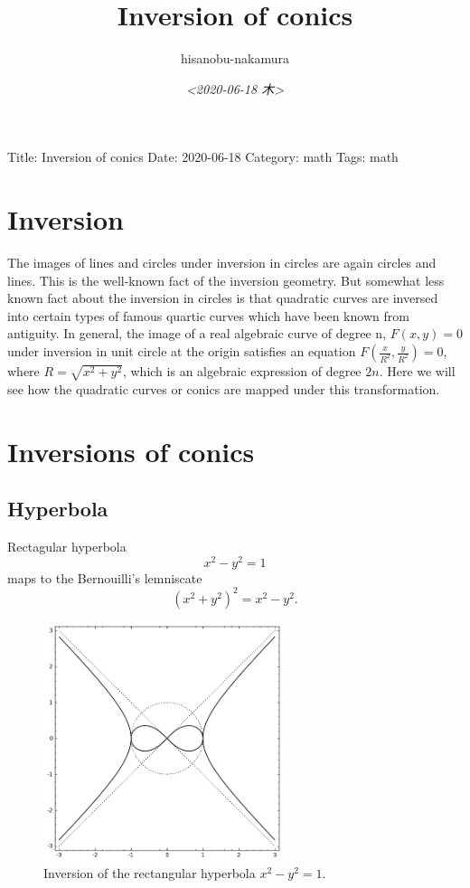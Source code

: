 \documentclass{article}
\author{hisanobu-nakamura}
\date{\textit{<2020-06-18 木>}}
\title{Inversion of conics}
\begin{document}
\maketitle
Title: Inversion of conics
Date: 2020-06-18
Category: math
Tags: math


\section{Inversion}
\label{sec-1}
The images of lines and circles under inversion in circles are again circles and lines.
 This is the well-known fact of the inversion geometry.
 But somewhat less known fact about the inversion in circles is that quadratic curves are inversed into certain types of famous quartic curves which have been known from antiguity.
 In general, the image of a real algebraic curve of degree n, $F(x,y)=0$ under inversion in unit circle at the origin satisfies an equation $F(\frac{x}{R^2},\frac{y}{R^2}) = 0$,
 where $R = \sqrt{x^2 + y^2}$, which is an algebraic expression of degree $2n$.
 Here we will see how the quadratic curves or conics are mapped under this transformation.
\section{Inversions of conics}
\label{sec-2}
\subsection{Hyperbola}
\label{sec-2-1}
Rectagular hyperbola
\begin{equation}
\label{ }
x^2 - y^2 = 1
\end{equation}
maps to the Bernouilli's lemniscate
\begin{equation}
\label{ }
(x^2 + y^2)^2 = x^2 - y^2.
\end{equation}

\begin{figure}[htb]
\centering
\includegraphics[width=70mm]{./images/hyperbola-lemniscate-pair.png}
\caption{\label{fig:inv-rec-hyp}Inversion of the rectangular hyperbola $x^2 -y^2 = 1$.}
\end{figure} \\
\end{document}
